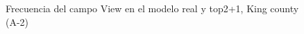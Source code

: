 \begin{figure}[H]
    \centering
    
    \caption{Frecuencia del campo View en el modelo real y top2+1, King county (A-2)}
    \label{frecuency-top2+1-view}
\end{figure}